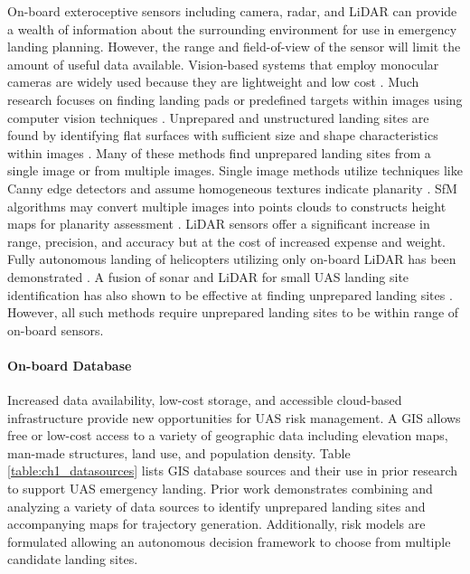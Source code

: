 On-board exteroceptive sensors including camera, radar, and LiDAR can provide a wealth of information about the surrounding environment for use in emergency landing planning. However, the range and field-of-view of the sensor will limit the amount of useful data available. Vision-based systems that employ monocular cameras are widely used because they are lightweight and low cost \cite{jin_-board_2016}. Much research focuses on finding landing pads or predefined targets within images using computer vision techniques \cite{yang_autonomous_2014}. Unprepared and unstructured landing sites are found by identifying flat surfaces with sufficient size and shape characteristics within images \cite{warren_enabling_2015}. Many of these methods find unprepared landing sites from a single image or from multiple images. Single image methods utilize techniques like Canny edge detectors and assume homogeneous textures indicate planarity \cite{Wu2018, YuFeiShen2013}. \ac{SfM} algorithms may convert multiple images into points clouds to constructs height maps for planarity assessment \cite{forster_continuous_2015, desaraju_vision-based_2015}. LiDAR sensors offer a significant increase in range, precision, and accuracy but at the cost of increased expense and weight. Fully autonomous landing of helicopters utilizing only on-board LiDAR has been demonstrated \cite{scherer_autonomous_2012, theodore_flight_2006}. A fusion of sonar and LiDAR for small UAS landing site identification has also shown to be effective at finding unprepared landing sites \cite{papa_uas_2018}. However, all such methods require unprepared landing sites to be within range of on-board sensors.



\paragraph{On-board Database}

Increased data availability, low-cost storage, and accessible cloud-based infrastructure provide new opportunities for \ac{UAS} risk management. A \ac{GIS} allows free or low-cost access to a variety of geographic data including elevation maps, man-made structures, land use, and population density.  Table \ref{table:ch1_datasources} lists \ac{GIS} database sources and their use in prior research to support \ac{UAS} emergency landing. Prior work demonstrates combining and analyzing a variety of data sources to identify unprepared landing sites and accompanying maps for trajectory generation. Additionally, risk models are formulated allowing an autonomous decision framework to choose from multiple candidate landing sites.

